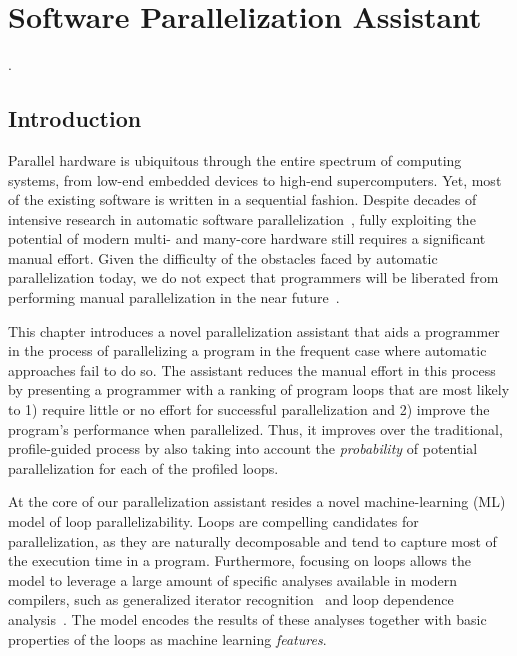 \chapter{Software Parallelization Assistant}
\label{assistant}.
\section{Introduction}


\quad Parallel hardware is ubiquitous through the entire spectrum of computing systems, from low-end embedded devices to high-end supercomputers.
%
Yet, most of the existing software is written in a sequential fashion.
%
Despite decades of intensive research in automatic software
parallelization~\cite{6813266}, fully exploiting the potential of modern multi- and many-core hardware still requires a significant manual effort.
%
Given the difficulty of the obstacles faced by automatic parallelization today, we do not expect that programmers will be liberated from performing manual parallelization in the near future~\cite{Larsen:2012:PML:2410141.2410600}.


This chapter introduces a novel parallelization assistant that aids a programmer in the process of parallelizing a program in the frequent case where automatic approaches fail to do so.
%
The assistant reduces the manual effort in this process by presenting a programmer with a ranking of program loops that are most likely to 1) require little or no effort for successful parallelization and 2) improve the program's performance when parallelized.
%
Thus, it improves over the traditional, profile-guided process by also taking into account the \emph{probability} of potential parallelization for each of the profiled loops.


At the core of our parallelization assistant resides a novel machine-learning (ML) model of loop parallelizability.
%
Loops are compelling candidates for parallelization, as they are naturally decomposable and tend to capture most of the execution time in a program.
%
Furthermore, focusing on loops allows the model to leverage a large amount of specific analyses available in modern compilers, such as generalized iterator recognition~\cite{Manilov:2018:GPI:3178372.3179511} and loop dependence analysis~\cite{Jensen:2017:ILD:3132652.3095754}.
%
The model encodes the results of these analyses together with basic properties of the loops as machine learning \textit{features}.

